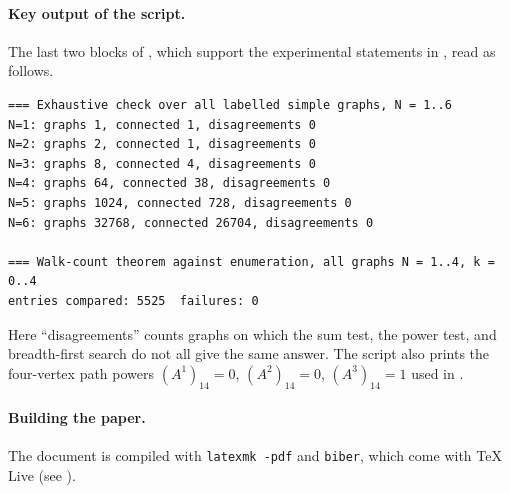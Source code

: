 \paragraph{Key output of the script.} The last two blocks of , which support the experimental statements in , read as follows.
\begin{verbatim}
=== Exhaustive check over all labelled simple graphs, N = 1..6
N=1: graphs 1, connected 1, disagreements 0
N=2: graphs 2, connected 1, disagreements 0
N=3: graphs 8, connected 4, disagreements 0
N=4: graphs 64, connected 38, disagreements 0
N=5: graphs 1024, connected 728, disagreements 0
N=6: graphs 32768, connected 26704, disagreements 0

=== Walk-count theorem against enumeration, all graphs N = 1..4, k = 0..4
entries compared: 5525  failures: 0
\end{verbatim}
Here ``disagreements'' counts graphs on which the sum test, the power test, and breadth-first search do not all give the same answer. The script also prints the four-vertex path powers $(A^1)_{14}=0$, $(A^2)_{14}=0$, $(A^3)_{14}=1$ used in .

\paragraph{Building the paper.} The document is compiled with \texttt{latexmk -pdf} and \texttt{biber}, which come with TeX Live (see ).
